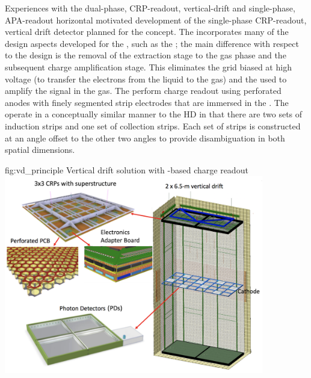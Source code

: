 \documentclass[../main-v1.tex]{subfiles}
\begin{document}
Experiences with the dual-phase, CRP-readout, vertical-drift and single-phase, APA-readout horizontal motivated development of the single-phase CRP-readout, vertical drift detector planned for
the  concept. The  incorporates many of the design aspects developed for the , such as the ;   the  main  difference  with  respect  to  the    design  is   the  removal  of  the  extraction  stage  to  the  gas  phase  and  the  subsequent  charge  amplification  stage.  %
This eliminates the grid biased at high voltage (to transfer the electrons from the liquid to the gas) and the  used to amplify the signal in the gas. The   %
perform charge readout using %
perforated  anodes with finely segmented strip electrodes %
that are immersed in the . The  operate in a conceptually similar manner to the HD  in that there are two sets of induction strips and one set of collection strips. Each set of strips is constructed at an angle offset to the other two angles to provide disambiguation in both spatial dimensions.

\begin{dunefigure}
{fig:vd_principle}
{Vertical drift solution with -based charge readout}
\includegraphics[width=0.85\textwidth]{graphics/IntroFigures/Fig_13_VD_solution.png}
\end{dunefigure}
\end{document}
